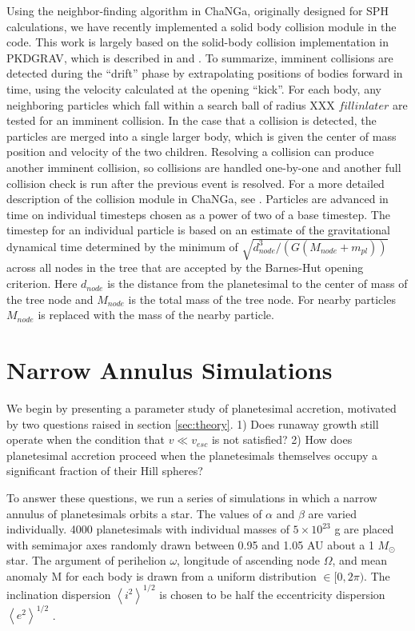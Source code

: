 \documentclass[twocolumn]{aastex63}
\begin{document}
Using the neighbor-finding algorithm in {\sc ChaNGa}, originally
designed for SPH calculations, we have recently implemented a solid
body collision module in the code.  This work is largely based on the
solid-body collision implementation in {\sc PKDGRAV}, which is
described in \citet{richardson94} and \citet{richardson00}. To
summarize, imminent collisions are detected during the ``drift'' phase
by extrapolating positions of bodies forward in time, using the
velocity calculated at the opening ``kick''. For each body, any
neighboring particles which fall within a search ball of radius XXX
$fill in later$ are tested for an imminent collision. In the case that
a collision is detected, the particles are merged into a single larger
body, which is given the center of mass position and velocity of the
two children. Resolving a collision can produce another imminent
collision, so collisions are handled one-by-one and another full
collision check is run after the previous event is resolved. For a
more detailed description of the collision module in {\sc ChaNGa}, see
\citep{wallace19}.
Particles are advanced in time on individual timesteps chosen as a
power of two of a base timestep.  The timestep for an individual
particle is based on an estimate of the gravitational dynamical time
determined by the minimum of $\sqrt{d_{node}^3/(G(M_{node} + m_{pl}))}$
across all nodes in the tree that are accepted by the Barnes-Hut
opening criterion.  Here $d_{node}$ is the distance from the
planetesimal to the center of mass of the tree node and $M_{node}$ is
the total mass of the tree node.  For nearby particles $M_{node}$ is
replaced with the mass of the nearby particle.

\section{Narrow Annulus Simulations}\label{sec:narrow}

We begin by presenting a parameter study of planetesimal accretion,
motivated by two questions raised in section \ref{sec:theory}. 1) Does
runaway growth still operate when the condition that $v \ll v_{esc}$
is not satisfied? 2) How does planetesimal accretion proceed when the planetesimals themselves occupy a significant fraction of their Hill spheres?

To answer these questions, we run a series of simulations in which a
narrow annulus of planetesimals orbits a star. The values of $\alpha$
and $\beta$ are varied individually. 4000 planetesimals with
individual masses of $5 \times 10^{23}$ g are placed with semimajor
axes randomly drawn between 0.95 and 1.05 AU about a 1 $M_{\odot}$
star. The argument of perihelion $\omega$, longitude of ascending node
$\Omega$, and mean anomaly M for each body is drawn from a uniform
distribution $\in [0, 2 \pi)$. The inclination dispersion $\left<
i^{2} \right>^{1/2}$ is chosen to be half the eccentricity
dispersion $\left< e^{2} \right>^{1/2}$ \citep{ida93a}.
\end{document}
